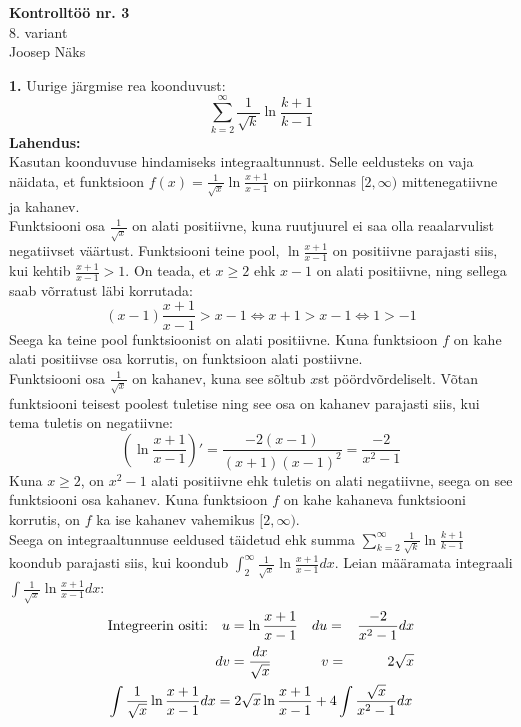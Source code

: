 \documentclass{article}
\begin{document}
\begin{center}
\Large\textbf{Kontrollt\"o\"o nr. 3}\\
8. variant\\
\small{Joosep N\"aks}
\end{center}
\textbf{1.} Uurige j\"argmise rea koonduvust:
\begin{equation*}
\sum_{k=2}^\infty\frac{1}{\sqrt{k}}\ln\frac{k+1}{k-1}
\end{equation*}
\textbf{Lahendus:}\\
Kasutan koonduvuse hindamiseks integraaltunnust. Selle eeldusteks on vaja n\"aidata, et funktsioon $f(x)=\frac{1}{\sqrt{x}}\ln\frac{x+1}{x-1}$ on piirkonnas $[2,\infty)$ mittenegatiivne ja kahanev.\\
Funktsiooni osa $\frac{1}{\sqrt{x}}$ on alati positiivne, kuna ruutjuurel ei saa olla reaalarvulist negatiivset v\"a\"artust. Funktsiooni teine pool, $\ln\frac{x+1}{x-1}$ on positiivne parajasti siis, kui kehtib $\frac{x+1}{x-1}>1$. On teada, et $x\geq2$ ehk $x-1$ on alati positiivne, ning sellega saab v\~orratust l\"abi korrutada: 
\begin{equation*}
(x-1)\frac{x+1}{x-1}>x-1\Leftrightarrow x+1>x-1\Leftrightarrow 1>-1
\end{equation*}
Seega ka teine pool funktsioonist on alati positiivne. Kuna funktsioon $f$ on kahe alati positiivse osa korrutis, on funktsioon alati postiivne.\\
Funktsiooni osa $\frac{1}{\sqrt{x}}$ on kahanev, kuna see s\~oltub $x$st p\"o\"ordv\~ordeliselt. V\~otan funktsiooni teisest poolest tuletise ning see osa on kahanev parajasti siis, kui tema tuletis on negatiivne:
\begin{equation*}
\left(\ln\frac{x+1}{x-1}\right)'=\frac{-2(x-1)}{(x+1)(x-1)^2}=\frac{-2}{x^2-1}
\end{equation*}
Kuna $x\geq2$, on $x^2-1$ alati positiivne ehk tuletis on alati negatiivne, seega on see funktsiooni osa kahanev. Kuna funktsioon $f$ on kahe kahaneva funktsiooni korrutis, on $f$ ka ise kahanev vahemikus $[2,\infty)$.\\
Seega on integraaltunnuse eeldused t\"aidetud ehk summa $\sum_{k=2}^\infty\frac{1}{\sqrt{k}}\ln\frac{k+1}{k-1}$ koondub parajasti siis, kui koondub $\int_{2}^\infty\frac{1}{\sqrt{x}}\ln\frac{x+1}{x-1}dx$. Leian m\"a\"aramata integraali $\int\frac{1}{\sqrt{x}}\ln\frac{x+1}{x-1}dx$:
\begin{gather*}
\begin{aligned}
\text{Integreerin ositi:}\quad u&=\ln\frac{x+1}{x-1}&& du=&\frac{-2}{x^2-1}dx\\
dv&=\frac{dx}{\sqrt{x}}&& \null\ \ v=&2\sqrt{x}\\
\end{aligned}\\
\int\frac{1}{\sqrt{x}}\ln\frac{x+1}{x-1}dx=2\sqrt{x}\ln\frac{x+1}{x-1}+4\int\frac{\sqrt{x}}{x^2-1}dx
\end{gather*}
\end{document}
